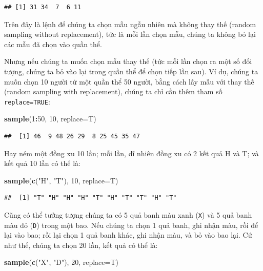 \documentclass[
]{book}
\newenvironment{Shaded}{\begin{snugshade}}{\end{snugshade}}
\newcommand{\DataTypeTok}[1]{\textcolor[rgb]{0.13,0.29,0.53}{#1}}
\newcommand{\DecValTok}[1]{\textcolor[rgb]{0.00,0.00,0.81}{#1}}
\newcommand{\KeywordTok}[1]{\textcolor[rgb]{0.13,0.29,0.53}{\textbf{#1}}}
\newcommand{\NormalTok}[1]{#1}
\newcommand{\OperatorTok}[1]{\textcolor[rgb]{0.81,0.36,0.00}{\textbf{#1}}}
\newcommand{\StringTok}[1]{\textcolor[rgb]{0.31,0.60,0.02}{#1}}
\begin{document}
\begin{verbatim}
## [1] 31 34  7  6 11
\end{verbatim}

Trên đây là lệnh để chúng ta chọn mẫu ngẫu nhiên mà không thay thế (random sampling without replacement), tức là mỗi lần chọn mẫu, chúng ta không bỏ lại các mẫu đã chọn vào quần thể.

Nhưng nếu chúng ta muốn chọn mẫu thay thế (tức mỗi lần chọn ra một số đối tượng, chúng ta bỏ vào lại trong quần thể để chọn tiếp lần sau). Ví dụ, chúng ta muốn chọn 10 người từ một quần thể 50 người, bằng cách lấy mẫu với thay thế (random sampling with replacement), chúng ta chỉ cần thêm tham số \texttt{replace=TRUE}:

\begin{Shaded}
\begin{Highlighting}[]
\KeywordTok{sample}\NormalTok{(}\DecValTok{1}\OperatorTok{:}\DecValTok{50}\NormalTok{, }\DecValTok{10}\NormalTok{, }\DataTypeTok{replace=}\NormalTok{T)}
\end{Highlighting}
\end{Shaded}

\begin{verbatim}
##  [1] 46  9 48 26 29  8 25 45 35 47
\end{verbatim}

Hay ném một đồng xu 10 lần; mỗi lần, dĩ nhiên đồng xu có 2 kết quả H và T; và kết quả 10 lần có thể là:

\begin{Shaded}
\begin{Highlighting}[]
\KeywordTok{sample}\NormalTok{(}\KeywordTok{c}\NormalTok{(}\StringTok{"H"}\NormalTok{, }\StringTok{"T"}\NormalTok{), }\DecValTok{10}\NormalTok{, }\DataTypeTok{replace=}\NormalTok{T)}
\end{Highlighting}
\end{Shaded}

\begin{verbatim}
##  [1] "T" "H" "H" "H" "T" "H" "T" "T" "H" "T"
\end{verbatim}

Cũng có thể tưởng tượng chúng ta có 5 quả banh màu xanh (\texttt{X}) và 5 quả banh màu đỏ (\texttt{D}) trong một bao. Nếu chúng ta chọn 1 quả banh, ghi nhận màu, rồi để lại vào bao; rồi lại chọn 1 quả banh khác, ghi nhận màu, và bỏ vào bao lại. Cứ như thế, chúng ta chọn 20 lần, kết quả có thể là:

\begin{Shaded}
\begin{Highlighting}[]
\KeywordTok{sample}\NormalTok{(}\KeywordTok{c}\NormalTok{(}\StringTok{"X"}\NormalTok{, }\StringTok{"D"}\NormalTok{), }\DecValTok{20}\NormalTok{, }\DataTypeTok{replace=}\NormalTok{T)}
\end{Highlighting}
\end{Shaded}
\end{document}
